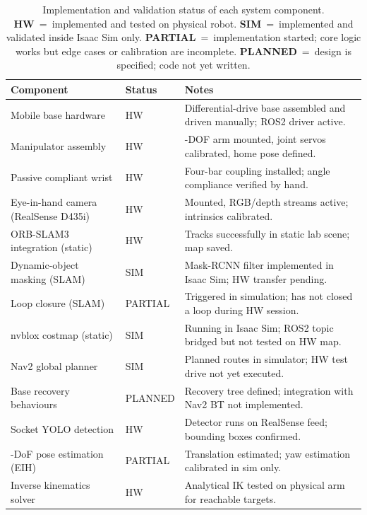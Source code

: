 \begin{table}[!htbp]
\centering
\caption{Implementation and validation status of each system component. \textbf{HW}~=~implemented and tested on physical robot. \textbf{SIM}~=~implemented and validated inside Isaac Sim only. \textbf{PARTIAL}~=~implementation started; core logic works but edge cases or calibration are incomplete. \textbf{PLANNED}~=~design is specified; code not yet written.}
\label{exp:tab:claim-status}
\small
\setlength{\tabcolsep}{5pt}
\begin{tabular}{@{}>{\raggedright\arraybackslash}p{}
                    >{\centering\arraybackslash}p{}
                    >{\raggedright\arraybackslash}p{}@{}}
\toprule
Component & Status & Notes \\
\midrule
Mobile base hardware & HW & Differential-drive base assembled and driven manually; ROS2 driver active. \\
Manipulator assembly & HW & 4-DOF arm mounted, joint servos calibrated, home pose defined. \\
Passive compliant wrist & HW & Four-bar coupling installed; angle compliance verified by hand. \\
Eye-in-hand camera (RealSense D435i) & HW & Mounted, RGB/depth streams active; intrinsics calibrated. \\
ORB-SLAM3 integration (static) & HW & Tracks successfully in static lab scene; map saved. \\
Dynamic-object masking (SLAM) & SIM & Mask-RCNN filter implemented in Isaac Sim; HW transfer pending. \\
Loop closure (SLAM) & PARTIAL & Triggered in simulation; has not closed a loop during HW session. \\
nvblox costmap (static) & SIM & Running in Isaac Sim; ROS2 topic bridged but not tested on HW map. \\
Nav2 global planner & SIM & Planned routes in simulator; HW test drive not yet executed. \\
Base recovery behaviours & PLANNED & Recovery tree defined; integration with Nav2 BT not implemented. \\
Socket YOLO detection & HW & Detector runs on RealSense feed; bounding boxes confirmed. \\
6-DoF pose estimation (EIH) & PARTIAL & Translation estimated; yaw estimation calibrated in sim only. \\
Inverse kinematics solver & HW & Analytical IK tested on physical arm for reachable targets. \\

\end{tabular}
\end{table}
